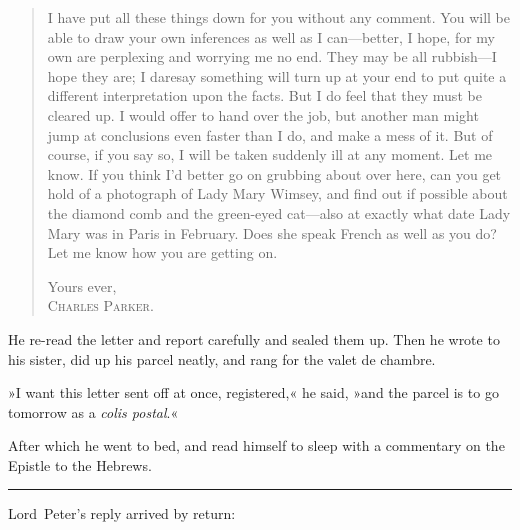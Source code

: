 \begin{quote}

I have put all these things down for you without any comment. You will be able to draw your own inferences as well as I can—better, I hope, for my own are perplexing and worrying me no end. They may be all rubbish—I hope they are; I daresay something will turn up at your end to put quite a different interpretation upon the facts. But I do feel that they must be cleared up. I would offer to hand over the job, but another man might jump at conclusions even faster than I do, and make a mess of it. But of course, if you say so, I will be taken suddenly ill at any moment. Let me know. If you think I'd better go on grubbing about over here, can you get hold of a photograph of Lady Mary Wimsey, and find out if possible about the diamond comb and the green-eyed cat—also at exactly what date Lady Mary was in Paris in February. Does she speak French as well as you do? Let me know how you are getting on.

\begin{flushright}
Yours ever,\\
\textsc{Charles Parker.}
\end{flushright}
\end{quote}


He re-read the letter and report carefully and sealed them up. Then he wrote to his sister, did up his parcel neatly, and rang for the valet de chambre.

»I want this letter sent off at once, registered,« he said, »and the parcel is to go tomorrow as a \textit{colis postal}.«

After which he went to bed, and read himself to sleep with a commentary on the Epistle to the Hebrews.

\noindent\hfil\rule{0.5\textwidth}{.4pt}\hfil

Lord~Peter's reply arrived by return:

